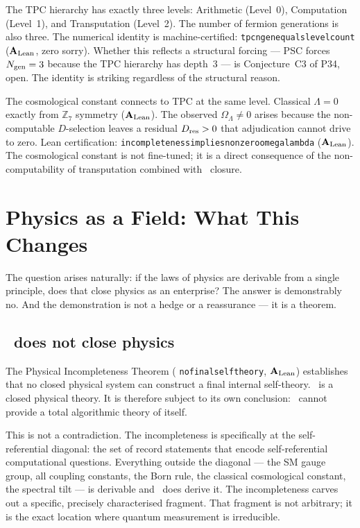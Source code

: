 \documentclass[11pt,openany]{book}
\theoremstyle{remark}
\newcommand{\GTE}{\text{GTE}}
\newcommand{\PSC}{\text{PSC}}
\newcommand{\ZS}{\mathbb{Z}_7}
\newcommand{\lean}[1]{%
  \penalty-100
  \begingroup\def\_{\textunderscore\allowbreak}\texttt{#1}\endgroup}
\newcommand{\OmL}{\Omega_\Lambda}
\newcommand{\Dres}{D_{\rm res}}
\newcommand{\Ngen}{N_{\rm gen}}
\newcommand{\CatAL}{\ensuremath{\textbf{A}_{\rm Lean}}}
\begin{document}
The TPC hierarchy has exactly three levels: Arithmetic (Level~0), Computation
(Level~1), and Transputation (Level~2). The number of fermion generations is
also three. The numerical identity is machine-certified:
\lean{tpc\_ngen\_equals\_level\_count} (\CatAL, zero sorry). Whether this
reflects a structural forcing --- PSC forces $\Ngen = 3$ because the TPC
hierarchy has depth~3 --- is Conjecture~C3 of P34, open. The identity is
striking regardless of the structural reason.

The cosmological constant connects to TPC at the same level. Classical $\Lambda = 0$
exactly from $\ZS$ symmetry (\CatAL). The observed $\OmL \neq 0$ arises because
the non-computable $D$-selection leaves a residual $\Dres > 0$ that adjudication
cannot drive to zero. Lean certification:
\lean{incompleteness\_implies\_nonzero\_omega\_lambda} (\CatAL). The cosmological
constant is not fine-tuned; it is a direct consequence of the non-computability
of transputation combined with \PSC\ closure.

\section{Physics as a Field: What This Changes}
\label{sec:physics_field}

The question arises naturally: if the laws of physics are derivable from a single
principle, does that close physics as an enterprise? The answer is demonstrably no.
And the demonstration is not a hedge or a reassurance --- it is a theorem.

\subsection*{\GTE\ does not close physics}

The Physical Incompleteness Theorem (\lean{no\_final\_self\_theory}, \CatAL)
establishes that no closed physical system can construct a final internal
self-theory. \GTE\ is a closed physical theory. It is therefore subject to its own
conclusion: \GTE\ cannot provide a total algorithmic theory of itself.

This is not a contradiction. The incompleteness is specifically at the self-referential
diagonal: the set of record statements that encode self-referential computational
questions. Everything outside the diagonal --- the SM gauge group, all coupling
constants, the Born rule, the classical cosmological constant, the spectral tilt ---
is derivable and \GTE\ does derive it. The incompleteness carves out a specific,
precisely characterised fragment. That fragment is not arbitrary; it is the exact
location where quantum measurement is irreducible.
\end{document}
